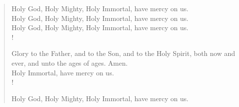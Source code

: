 \begin{verse}
    Holy God, Holy Mighty, Holy Immortal, have mercy on us. \\
    Holy God, Holy Mighty, Holy Immortal, have mercy on us. \\
    Holy God, Holy Mighty, Holy Immortal, have mercy on us. \\!

    Glory to the Father, and to the Son, and to the Holy Spirit, both now and ever, and unto the ages of ages. Amen. \\
    Holy Immortal, have mercy on us. \\!

    Holy God, Holy Mighty, Holy Immortal, have mercy on us. 
\end{verse}
